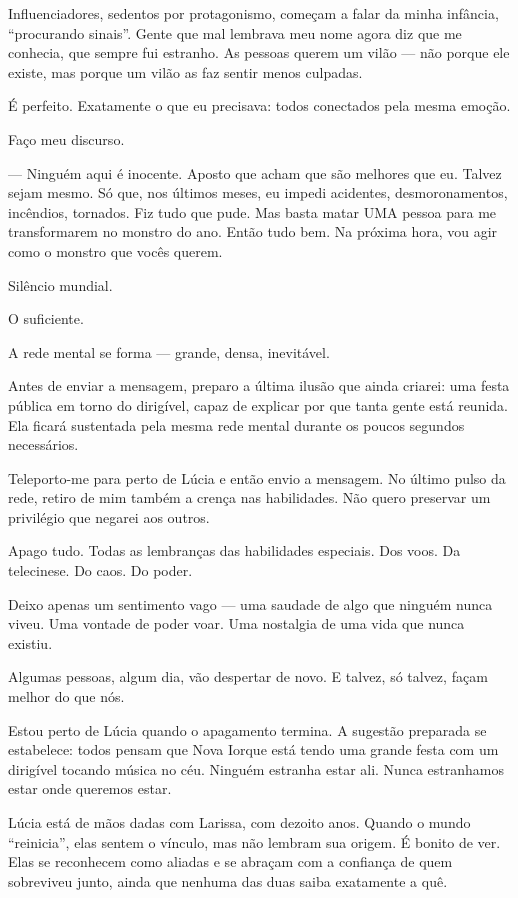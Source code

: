 Influenciadores, sedentos por protagonismo, começam a falar da minha infância, “procurando sinais”. Gente que mal lembrava meu nome agora diz que me conhecia, que sempre fui estranho. As pessoas querem um vilão — não porque ele existe, mas porque um vilão as faz sentir menos culpadas.

É perfeito.  
Exatamente o que eu precisava:  
todos conectados pela mesma emoção.

Faço meu discurso.

— Ninguém aqui é inocente. Aposto que acham que são melhores que eu. Talvez sejam mesmo. Só que, nos últimos meses, eu impedi acidentes, desmoronamentos, incêndios, tornados. Fiz tudo que pude. Mas basta matar UMA pessoa para me transformarem no monstro do ano. Então tudo bem. Na próxima hora, vou agir como o monstro que vocês querem.

Silêncio mundial.

O suficiente.

A rede mental se forma — grande, densa, inevitável.

Antes de enviar a mensagem, preparo a última ilusão que ainda criarei: uma festa pública em torno do dirigível, capaz de explicar por que tanta gente está reunida. Ela ficará sustentada pela mesma rede mental durante os poucos segundos necessários.

Teleporto-me para perto de Lúcia e então envio a mensagem. No último pulso da rede, retiro de mim também a crença nas habilidades. Não quero preservar um privilégio que negarei aos outros.

\bigskip

Apago tudo.  
Todas as lembranças das habilidades especiais.  
Dos voos.  
Da telecinese.  
Do caos.  
Do poder.

Deixo apenas um sentimento vago — uma saudade de algo que ninguém nunca viveu. Uma vontade de poder voar. Uma nostalgia de uma vida que nunca existiu.

Algumas pessoas, algum dia, vão despertar de novo.  
E talvez, só talvez, façam melhor do que nós.

\bigskip

Estou perto de Lúcia quando o apagamento termina. A sugestão preparada se estabelece: todos pensam que Nova Iorque está tendo uma grande festa com um dirigível tocando música no céu. Ninguém estranha estar ali. Nunca estranhamos estar onde queremos estar.

Lúcia está de mãos dadas com Larissa, com dezoito anos. Quando o mundo “reinicia”, elas sentem o vínculo, mas não lembram sua origem. É bonito de ver. Elas se reconhecem como aliadas e se abraçam com a confiança de quem sobreviveu junto, ainda que nenhuma das duas saiba exatamente a quê.

